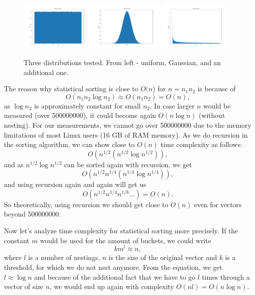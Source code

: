 \documentclass[12pt]{article}
\begin{document}
		\begin{figure}
		\begin{center}
			\includegraphics[width=0.32\textwidth]{fig_dist_norm}
			\includegraphics[width=0.32\textwidth]{fig_dist_gauss}
			\includegraphics[width=0.32\textwidth]{fig_dist_weird}
		\end{center}
		\caption{Three distributions tested. From left - uniform, Gaussian, and an additional one.}
		\label{fig4}
		\end{figure}		
						
		The reason why statistical sorting is close to $O(n$) for $n = n_1 n_2$ is because of
		\[
		O(n_1 n_2 \log n_2) \approx O(n_1 n_2) = O(n),
		\]
		as $\log n_2$ is approximately constant for small $n_2$. In case larger $n$ would be measured (over 500000000), it could become again $O(n \log n)$ (without nesting). For our measurements, we cannot go over 500000000 due to the memory limitations of most Linux users (16 GB of RAM memory). 
		As we do recursion in the sorting algorithm, we can show close to $O(n)$ time complexity as follows:
		\[
		O(n^{1/2} (n^{1/2} \log n^{1/2})),
		\]
		and as $n^{1/2} \log n^{1/2}$ can be sorted again with recursion, we get
		\[
		O(n^{1/2} n^{1/4} (n^{1/4} \log n^{1/4})),
		\]
		and using recursion again and again will get us
		\[
		O(n^{1/2} n^{1/4} n^{1/8} ...) = O(n).
		\]
		So theoretically, using recursion we should get close to $O(n)$ even for vectors beyond 500000000.
        
        Now let's analyze time complexity for statistical sorting more precisely. If the constant $m$ would be used for the amount of buckets, we could write
        \[
        k m^l \approx n, 
        \]
        where $l$ is a number of nestings, $n$ is the size of the original vector and $k$ is a threshold, for which we do not nest anymore. From the equation, we get $l \approx \log n$ and because of the additional fact that we have to go $l$ times through a vector of size $n$, we would end up again with complexity $O(n l) = O(n \log n)$.
\end{document}
